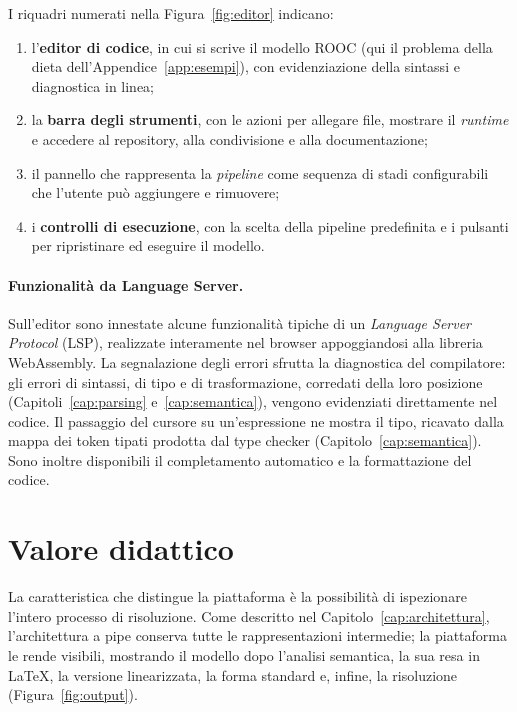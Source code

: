 \noindent I riquadri numerati nella Figura~\ref{fig:editor} indicano:
\begin{enumerate}
  \item l'\textbf{editor di codice}, in cui si scrive il modello ROOC (qui il
        problema della dieta dell'Appendice~\ref{app:esempi}), con evidenziazione
        della sintassi e diagnostica in linea;
  \item la \textbf{barra degli strumenti}, con le azioni per allegare file,
        mostrare il \emph{runtime} e accedere al repository, alla condivisione e
        alla documentazione;
  \item il pannello che rappresenta la \emph{pipeline} come
        sequenza di stadi configurabili che l'utente può aggiungere e rimuovere;
  \item i \textbf{controlli di esecuzione}, con la scelta della pipeline
        predefinita e i pulsanti per ripristinare ed eseguire il modello.
\end{enumerate}

\paragraph{Funzionalità da Language Server.}
Sull'editor sono innestate alcune funzionalità tipiche di un \emph{Language
Server Protocol} (LSP), realizzate interamente nel browser appoggiandosi alla
libreria WebAssembly. La segnalazione degli errori sfrutta la diagnostica del
compilatore: gli errori di sintassi, di tipo e di trasformazione, corredati della
loro posizione (Capitoli~\ref{cap:parsing} e~\ref{cap:semantica}), vengono
evidenziati direttamente nel codice. Il passaggio del cursore su un'espressione
ne mostra il tipo, ricavato dalla mappa dei token tipati prodotta dal type
checker (Capitolo~\ref{cap:semantica}). Sono inoltre disponibili il completamento
automatico e la formattazione del codice.

\section{Valore didattico}
\label{sec:valore-didattico}

La caratteristica che distingue la piattaforma è la possibilità di ispezionare
l'intero processo di risoluzione. Come
descritto nel Capitolo~\ref{cap:architettura}, l'architettura a pipe conserva
tutte le rappresentazioni intermedie; la piattaforma le rende visibili, mostrando
il modello dopo l'analisi semantica, la sua resa in LaTeX, la versione
linearizzata, la forma standard e, infine, la risoluzione
(Figura~\ref{fig:output}).

